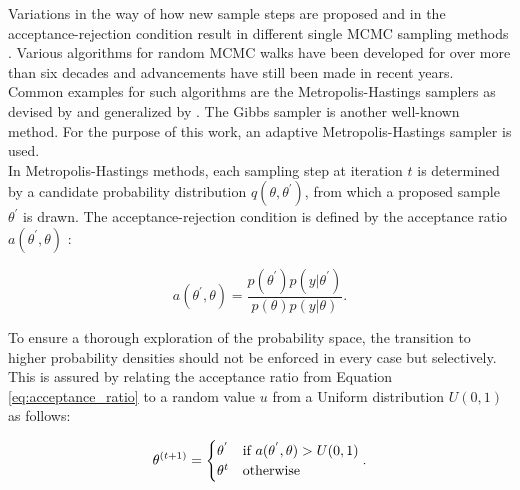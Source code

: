         Variations in the way of how new  sample steps are proposed and in the acceptance-rejection condition result in different single MCMC sampling methods \citep{schaaf2017, delaVarga2016}. Various algorithms for random MCMC walks have been developed for over more than six decades and advancements have still been made in recent years. Common examples for such algorithms are the Metropolis-Hastings samplers as devised by \citet{metropolis1953equation} and generalized by \citet{hastings1970}. The Gibbs sampler \citep{geman1984stochastic} is another well-known method. 
        For the purpose of this work, an adaptive Metropolis-Hastings sampler is used.\\
        In Metropolis-Hastings methods, each sampling step at iteration $t$ is determined by a candidate probability distribution $q(\theta,\theta^{'})$, from which a proposed sample $\theta^{'}$ is drawn. The acceptance-rejection condition is defined by the acceptance ratio $a(\theta^{'},\theta)$ \citep{haario2001adaptive}:
        
        \begin{equation}\label{eq:acceptance_ratio}
        a(\theta^{'},\theta)=\frac{p(\theta^{'})p(y|\theta^{'})}{p(\theta)p(y|\theta)}.
        \end{equation}
        
        To ensure a thorough exploration of the probability space, the transition to higher probability densities should not be enforced in every case but selectively. This is assured by relating the acceptance ratio from Equation \ref{eq:acceptance_ratio} to a random value $u$ from a Uniform distribution $U(0,1)$ as follows:
        
        \begin{equation}\label{eq:transition_selectivity}
        \theta^{(t+1)}=\begin{cases}
        \theta^{'} & $if $ a(\theta^{'},\theta)>U(0,1)\\
        \theta^{t} & $otherwise$\\
        \end{cases}.
        \end{equation}
        

